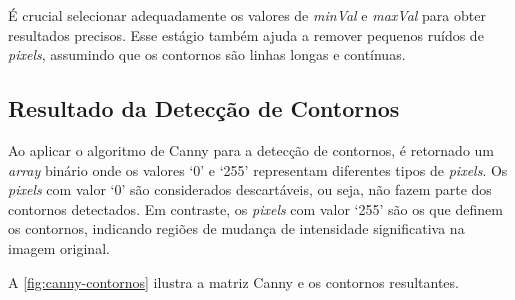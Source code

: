 É crucial selecionar adequadamente os valores de \textit{minVal} e \textit{maxVal} para obter resultados precisos. Esse estágio também ajuda a remover pequenos ruídos de \textit{pixels}, assumindo que os contornos são linhas longas e contínuas.

\subsection{Resultado da Detecção de Contornos}
\label{sec:resultado-deteccao-contornos}

Ao aplicar o algoritmo de Canny para a detecção de contornos, é retornado um \textit{array} binário onde os valores `0' e `255' representam diferentes tipos de \textit{pixels}. Os \textit{pixels} com valor `0' são considerados descartáveis, ou seja, não fazem parte dos contornos detectados. Em contraste, os \textit{pixels} com valor `255' são os que definem os contornos, indicando regiões de mudança de intensidade significativa na imagem original.

A \autoref{fig:canny-contornos} ilustra a matriz Canny e os contornos resultantes.

